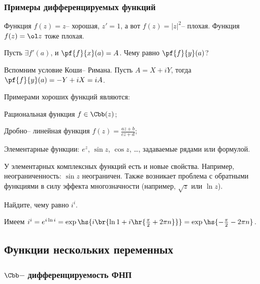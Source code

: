 \documentclass[a4paper]{article}
\begin{document}
\subsubsection{Примеры дифференцируемых функций}

Функция $f(z)=z$-- хорошая, $z'=1$, а вот $f(z) = |z|^2$-- плохая. Функция $f(z)=\ol z$ тоже плохая.

\begin{problem}
Пусть $\exi f'(a)$, и $\pf{f}{x}(a)=A$. Чему равно $\pf{f}{y}(a)$?
\end{problem}
\begin{solution}
Вспомним условие Коши-- Римана. Пусть $A=X+iY$, тогда $\pf{f}{y}(a)=-Y+iX=iA$.
\end{solution}

Примерами хороших функций являются:

\begin{items}{-2}
\item Рациональная функция $f \in \Cbb(z)$;
\item Дробно-- линейная функция $f(z) = \frac{az+b}{cz+d}$;
\item Элементарные функции: $e^{z}$, $\sin z$, $\cos z$, \dots, задаваемые рядами или формулой.
\end{items}

\begin{note}
У элементарных комплексных функций есть и новые свойства. Например, неограниченность: $\sin z$ неограничен.
Также возникает проблема с обратными функциями в силу эффекта многозначности (например, $\sqrt{z}$ или $\ln z$).
\end{note}

\begin{problem}
Найдите, чему равно $i^i$.
\end{problem}
\begin{solution}
Имеем
$i^i = e^{i\ln i} = \exp\hs{i\br{\ln 1 + i\hr{\frac{\pi }{2} + 2\pi n}}} = \exp\hs{-\frac{\pi}{2}-2\pi n}$.
\end{solution}


\subsection{Функции нескольких переменных}

\subsubsection{$\Cbb$-- дифференцируемость ФНП}
\end{document}
